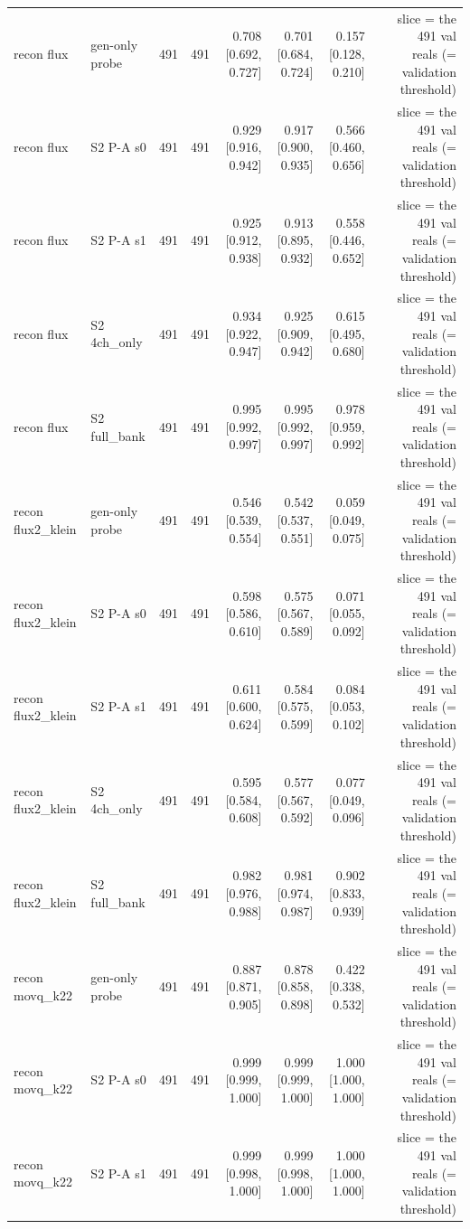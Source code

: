 \begin{table}[htbp]
\begin{tabular}{llrrrrrrr}
recon flux & gen-only probe & 491 & 491 & 0.708 [0.692, 0.727] & 0.701 [0.684, 0.724] & 0.157 [0.128, 0.210] &  & slice = the 491 val reals (= validation threshold) \\
recon flux & S2 P-A s0 & 491 & 491 & 0.929 [0.916, 0.942] & 0.917 [0.900, 0.935] & 0.566 [0.460, 0.656] &  & slice = the 491 val reals (= validation threshold) \\
recon flux & S2 P-A s1 & 491 & 491 & 0.925 [0.912, 0.938] & 0.913 [0.895, 0.932] & 0.558 [0.446, 0.652] &  & slice = the 491 val reals (= validation threshold) \\
recon flux & S2 4ch\_only & 491 & 491 & 0.934 [0.922, 0.947] & 0.925 [0.909, 0.942] & 0.615 [0.495, 0.680] &  & slice = the 491 val reals (= validation threshold) \\
recon flux & S2 full\_bank & 491 & 491 & 0.995 [0.992, 0.997] & 0.995 [0.992, 0.997] & 0.978 [0.959, 0.992] &  & slice = the 491 val reals (= validation threshold) \\
recon flux2\_klein & gen-only probe & 491 & 491 & 0.546 [0.539, 0.554] & 0.542 [0.537, 0.551] & 0.059 [0.049, 0.075] &  & slice = the 491 val reals (= validation threshold) \\
recon flux2\_klein & S2 P-A s0 & 491 & 491 & 0.598 [0.586, 0.610] & 0.575 [0.567, 0.589] & 0.071 [0.055, 0.092] &  & slice = the 491 val reals (= validation threshold) \\
recon flux2\_klein & S2 P-A s1 & 491 & 491 & 0.611 [0.600, 0.624] & 0.584 [0.575, 0.599] & 0.084 [0.053, 0.102] &  & slice = the 491 val reals (= validation threshold) \\
recon flux2\_klein & S2 4ch\_only & 491 & 491 & 0.595 [0.584, 0.608] & 0.577 [0.567, 0.592] & 0.077 [0.049, 0.096] &  & slice = the 491 val reals (= validation threshold) \\
recon flux2\_klein & S2 full\_bank & 491 & 491 & 0.982 [0.976, 0.988] & 0.981 [0.974, 0.987] & 0.902 [0.833, 0.939] &  & slice = the 491 val reals (= validation threshold) \\
recon movq\_k22 & gen-only probe & 491 & 491 & 0.887 [0.871, 0.905] & 0.878 [0.858, 0.898] & 0.422 [0.338, 0.532] &  & slice = the 491 val reals (= validation threshold) \\
recon movq\_k22 & S2 P-A s0 & 491 & 491 & 0.999 [0.999, 1.000] & 0.999 [0.999, 1.000] & 1.000 [1.000, 1.000] &  & slice = the 491 val reals (= validation threshold) \\
recon movq\_k22 & S2 P-A s1 & 491 & 491 & 0.999 [0.998, 1.000] & 0.999 [0.998, 1.000] & 1.000 [1.000, 1.000] &  & slice = the 491 val reals (= validation threshold) \\

\end{tabular}
\end{table}
